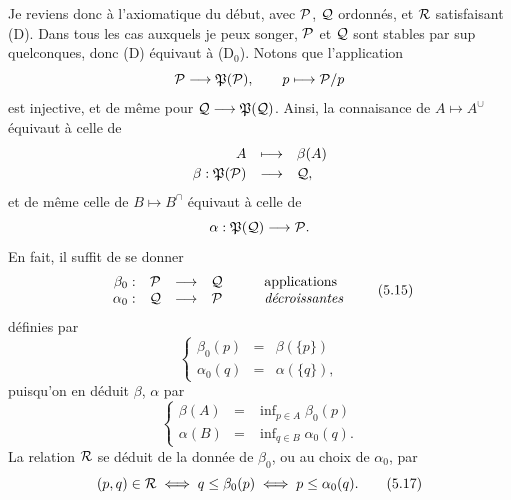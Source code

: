 Je reviens donc à l'axiomatique du début, avec $\mathcal{P}$, $\mathcal{Q}$ ordonnés, et $\mathcal{R}$ satisfaisant (D). Dans tous les cas auxquels je peux songer, $\mathcal{P}$ et $\mathcal{Q}$ sont stables par sup quelconques, donc (D) équivaut à (D$_0$). Notons que l'application
\[
\mathcal{P} \longrightarrow \mathfrak{P}(\mathcal{P}), \qquad p \longmapsto \mathcal{P}/p
\]
est injective, et de même pour $\mathcal{Q} \longrightarrow \mathfrak{P}(\mathcal{Q})$. Ainsi, la connaisance de $A \longmapsto A^{\cup}$ équivaut à celle de %
\[
\begin{array}{rcl}
A & \longmapsto & \beta(A)\\[0.5ex]
\beta : \mathfrak{P}(\mathcal{P}) & \longrightarrow & \mathcal{Q},
\end{array}
\]
et de même celle de $B \longmapsto B^{\cap}$ équivaut à
celle de
\[
\alpha : \mathfrak{P}(\mathcal{Q}) \longrightarrow \mathcal{P}.
\]
En fait, il suffit de se donner
\[
\begin{array}{rcccl}
\beta_0 : & \cP & \longrightarrow & \cQ & \qquad \text{applications}\\
\alpha_0 : & \cQ & \longrightarrow & \cP & \qquad \textit{décroissantes}
\end{array}
\tag*{(5.15)}
\]
définies par
\[
\left\{
\begin{array}{rcl}
\beta_0(p) & = & \beta(\{p\})\\[1ex]
\alpha_0(q) & = & \alpha(\{q\}),
\end{array}
\right.
\]
puisqu'on en déduit $\beta$, $\alpha$ par
\[
\left\{
\begin{array}{rcl}
\beta(A) & = & \inf\nolimits_{p \in A} \beta_0(p)\\[1ex]
\alpha(B) & = & \inf\nolimits_{q \in B} \alpha_0(q).
\end{array}
\right.
\tag*{(5.16)}
\]
La relation $\mathcal{R}$ se déduit de la donnée de $\beta_0$, ou au choix de $\alpha_0$, par
\[
(p,q) \in \cR \iff q \leq \beta_0(p) \iff p \leq \alpha_0(q).
\tag*{(5.17)}
\]


